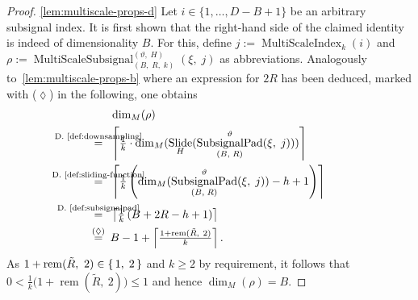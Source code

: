 \documentclass[journal]{IEEEtran}
\newcommand{\ROI}{B}
\newcommand{\discint}[2]{\{#1,\dotsc,#2\}}
\newcommand{\inint}[2]{\in\discint{#1}{#2}}
\DeclareMathOperator{\Slide}{Slide}
\newcommand{\rem}[2]{\operatorname{rem}(#1,\ #2)}
\newcommand{\equsing}[1]{\overset{\mathclap{\text{#1}}}{=}}
\DeclareMathOperator{\SubsignalPad}{SubsignalPad}
\newcommand{\SubsignalPadROIParams}{\SubsignalPad_{(\ROI,\; R)}^{\vartheta}}
\DeclareMathOperator{\MultiScaleSubsignal}{MultiScaleSubsignal}
\newcommand{\MultiScaleSubsignalROIParams}{\MultiScaleSubsignal_{(\ROI,\; R,\; k)}^{(\vartheta,\; H)}}
\DeclareMathOperator{\MultiScaleIndex}{MultiScaleIndex}
\begin{document}
\begin{proof}
\ref{lem:multiscale-props-d}
Let $i\inint{1}{D - \ROI + 1}$ be an arbitrary subsignal index.
It is first shown that the right-hand side of the claimed identity is indeed of dimensionality $\ROI$.
For this, define $j := \MultiScaleIndex_k(i)$ and $\rho := \MultiScaleSubsignalROIParams(\xi,\;j)$ as abbreviations.
Analogously to~\ref{lem:multiscale-props-b} where an expression for $2R$ has been deduced, marked with ($\lozenge$) in the following, one obtains
\begin{align*}
  &\dim_M(\rho)\\
  \equsing{D.~\ref{def:downsampling}}\ \ &\left\lceil \tfrac{1}{k}\cdot\dim_M(\Slide_H(\SubsignalPadROIParams(\xi,\;j))) \right\rceil\\
  \equsing{D.~\ref{def:sliding-function}}\ \ &\left\lceil \tfrac{1}{k}\left( \dim_M(\SubsignalPadROIParams(\xi,\;j)) - h + 1 \right) \right\rceil\\
  \equsing{D.~\ref{def:subsignalpad}}\ \ &\left\lceil \tfrac{1}{k}\left( \ROI + 2R - h + 1 \right) \right\rceil\\
  \equsing{($\lozenge$)}\ \ &\ROI - 1 + \left\lceil \tfrac{1 + \rem{\tilde{R}}{2}}{k} \right\rceil\text{.}
\end{align*}
As $1 + \rem{\tilde{R}}{2} \in\set{1,\;2}$ and $k\geq 2$ by requirement, it follows that $0 < \tfrac{1}{k}\big(1 + \rem{\tilde{R}}{2}\big) \leq 1$ and hence $\dim_M(\rho) = \ROI$.


\end{proof}
\end{document}
